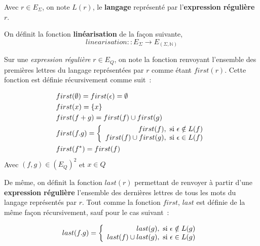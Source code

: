 \begin{Definition}
  Avec \(r \in E_{\Sigma}\), on note \(L(r)\), le \textbf{langage} représenté par 
  l'\textbf{expression régulière} \(r\).
\end{Definition}

\begin{Definition}
  On définit la fonction \textbf{linéarisation} de la façon suivante,
  \[
    linearisation :: E_{\Sigma} \to E_{(\Sigma, \mathbb{N})}
  \]
\end{Definition}

\begin{Definition}
  Sur une \textit{expression régulière} \(r \in E_{Q}\), on note la fonction 
  renvoyant l'ensemble des premières lettres du langage représentées par \(r\) 
  comme étant \(first(r)\). Cette fonction est définie récursivement comme 
  suit~:

  \begin{equation*}
    \begin{split}
    & first(\emptyset) = first(\epsilon) = \emptyset\\
    & first(x) = \{x\}\\
    & first(f + g) = first(f) \cup first(g)\\
    & first(f.g) = \left \{
      \begin{array}{r c l}
        first(f), \text{ si } \epsilon \notin L(f)\\
        first(f) \cup first(g), \text{ si } \epsilon \in L(f)\\
      \end{array}
      \right . \\
    & first(f^*) = first(f)
    \end{split}
  \end{equation*}
  Avec \((f,g) \in (E_{Q})^2\) et \(x \in Q\)
\end{Definition}

\begin{Definition}
  De même, on définit la fonction \(last(r)\) permettant de renvoyer à partir 
  d'une \textbf{expression régulière} l'ensemble des dernières lettres de tous 
  les mots du langage représentés par \(r\).
  Tout comme la fonction \(first\), \(last\) est définie de la même façon 
  récursivement, sauf pour le cas suivant~:

  \[
    last(f.g) = \left \{
      \begin{array}{r c l}
        last(g), \text{ si } \epsilon \notin L(g)\\
        last(f) \cup last(g), \text{ si } \epsilon \in L(g)\\
      \end{array}
      \right . \\
  \]
\end{Definition}

